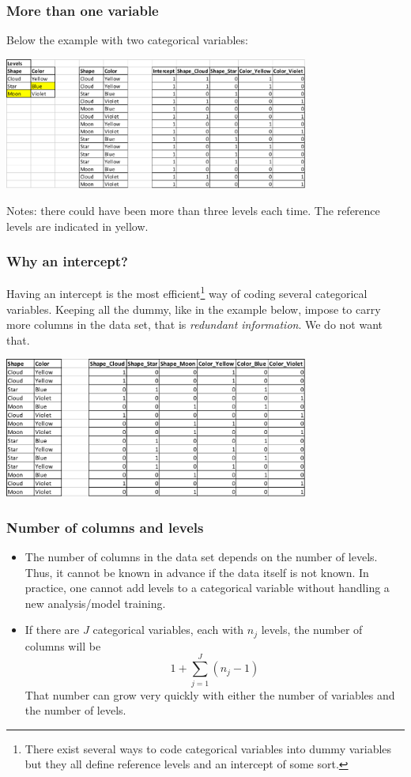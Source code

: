 \begin{frame}
\frametitle{More than one variable}
Below the example with two categorical variables:
\begin{center}
\includegraphics[width=10cm]{../Graphs/Dummy_3.png}  
\end{center}
\scriptsize
Notes: there could have been more than three levels each time. The reference levels are indicated in yellow.
\normalsize
\end{frame}
\begin{frame}
\frametitle{Why an intercept?}
Having an intercept is the most efficient\footnote{There exist several ways to code categorical variables into dummy variables but they all define reference levels and an intercept of some sort.} way of coding several categorical variables. Keeping all the dummy, like in the example below, impose to carry more columns in the data set, that is {\it redundant information}. We do not want that.
\begin{center}
\includegraphics[width=10cm]{../Graphs/Dummy_4.png}  
\end{center}
\end{frame}
\begin{frame}
\frametitle{Number of columns and levels}
\begin{itemize}
\item The number of columns in the data set depends on the number of levels. Thus, it cannot be known in advance if the data itself is not known. In practice, one cannot add levels to a categorical variable without handling a new analysis/model training. 
\item If there are $J$ categorical variables, each with $n_j$ levels, the number of columns will be
$$
1 + \sum_{j=1}^J (n_j - 1)
$$
That number can grow very quickly with either the number of variables and the number of levels. 
\end{itemize}
\end{frame}

